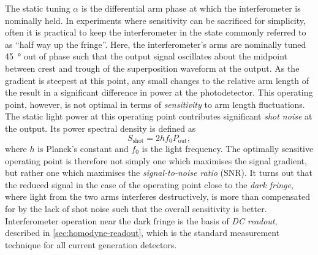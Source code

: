 The static tuning $\alpha$ is the differential arm phase at which the interferometer is nominally held. In experiments where sensitivity can be sacrificed for simplicity, often it is practical to keep the interferometer in the state commonly referred to as ``half way up the fringe''. Here, the interferometer's arms are nominally tuned \SI{45}{\degree} out of phase such that the output signal oscillates about the midpoint between crest and trough of the superposition waveform at the output. As the gradient is steepest at this point, any small changes to the relative arm length of the \MI{} result in a significant difference in power at the photodetector. This operating point, however, is not optimal in terms of \emph{sensitivity} to arm length fluctuations. The static light power at this operating point contributes significant \emph{shot noise} at the output. Its power spectral density is defined as~\cite{Meers1991}
\begin{equation}
  S_{\text{shot}} = 2 h f_0 P_{\text{out}},
\end{equation}
where $h$ is Planck's constant and $f_0$ is the light frequency. The optimally sensitive operating point is therefore not simply one which maximises the signal gradient, but rather one which maximises the \emph{signal-to-noise ratio} (\gls{SNR}). It turns out that the reduced signal in the case of the operating point close to the \emph{dark fringe}, where light from the two arms interferes destructively, is more than compensated for by the lack of shot noise such that the overall sensitivity is better. Interferometer operation near the dark fringe is the basis of \emph{\gls{DC} readout}, described in \cref{sec:homodyne-readout}, which is the standard measurement technique for all current generation detectors.

